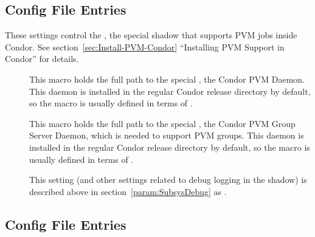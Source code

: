 \subsection{\label{sec:Shadow-PVM-Config-File-Entries}
 Config File Entries}

These settings control the , the special shadow
that supports PVM jobs inside Condor.  See
section~\ref{sec:Install-PVM-Condor} ``Installing PVM Support in
Condor'' for details.
\begin{description}

\item[] \label{param:PvmD}  This macro holds the full path
  to the special , the Condor PVM Daemon.  This daemon is
  installed in the regular Condor release directory by default, so the
  macro is usually defined in terms of .
  
\item[] \label{param:PvmGS} This macro holds the full
  path to the special , the Condor PVM Group Server
  Daemon, which is needed to support PVM groups.  This daemon is
  installed in the regular Condor release directory by default, so the
  macro is usually defined in terms of .

\item[] \label{param:ShadowDebug} This setting
  (and other settings related to debug logging in the shadow) is
  described above in section~\ref{param:SubsysDebug} as
  .

\end{description}

\subsection{\label{sec:Starter-Config-File-Entries}
 Config File Entries}

